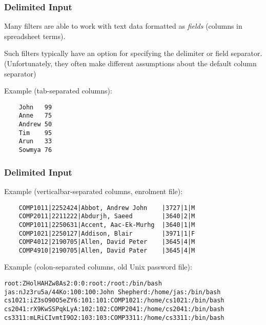 \begin{frame}[fragile]
\frametitle{Delimited Input}
Many filters are able to work with text data formatted as {\em{fields}}
(columns in spreadsheet terms).

Such filters typically have an option for specifying the delimiter or field separator.
\\
{\small (Unfortunately, they often make different assumptions about the default column separator)}

Example (tab-separated columns):
\begin{verbatim}
    John   99
    Anne   75
    Andrew 50
    Tim    95
    Arun   33
    Sowmya 76
\end{verbatim}

\end{frame}

\begin{frame}[fragile]
\frametitle{Delimited Input}
Example (verticalbar-separated columns, enrolment file):
\begin{verbatim}
    COMP1011|2252424|Abbot, Andrew John    |3727|1|M
    COMP2011|2211222|Abdurjh, Saeed        |3640|2|M
    COMP1011|2250631|Accent, Aac-Ek-Murhg  |3640|1|M
    COMP1021|2250127|Addison, Blair        |3971|1|F
    COMP4012|2190705|Allen, David Peter    |3645|4|M
    COMP4910|2190705|Allen, David Pater    |3645|4|M
\end{verbatim}
Example (colon-separated columns, old Unix password file):
\begin{small}
\begin{verbatim}
root:ZHolHAHZw8As2:0:0:root:/root:/bin/bash
jas:nJz3ru5a/44Ko:100:100:John Shepherd:/home/jas:/bin/bash
cs1021:iZ3sO90O5eZY6:101:101:COMP1021:/home/cs1021:/bin/bash
cs2041:rX9KwSSPqkLyA:102:102:COMP2041:/home/cs2041:/bin/bash
cs3311:mLRiCIvmtI9O2:103:103:COMP3311:/home/cs3311:/bin/bash
\end{verbatim}
\end{small}
\end{frame}

